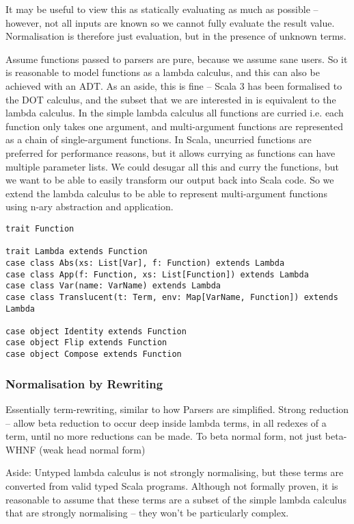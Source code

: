 \documentclass[../../main.tex]{subfiles}
\begin{document}
It may be useful to view this as statically evaluating as much as possible -- however, not all inputs are known so we cannot fully evaluate the result value.
Normalisation is therefore just evaluation, but in the presence of unknown terms.

Assume functions passed to parsers are pure, because we assume sane users.
So it is reasonable to model functions as a lambda calculus, and this can also be achieved with an ADT.
As an aside, this is fine -- Scala 3 has been formalised to the DOT calculus, and the subset that we are interested in is equivalent to the lambda calculus.
In the simple lambda calculus all functions are curried i.e. each function only takes one argument, and multi-argument functions are represented as a chain of single-argument functions.
In Scala, uncurried functions are preferred for performance reasons, but it allows currying as functions can have multiple parameter lists.
We could desugar all this and curry the functions, but we want to be able to easily transform our output back into Scala code.
So we extend the lambda calculus to be able to represent multi-argument functions using n-ary abstraction and application.

\begin{verbatim}
trait Function

trait Lambda extends Function
case class Abs(xs: List[Var], f: Function) extends Lambda
case class App(f: Function, xs: List[Function]) extends Lambda
case class Var(name: VarName) extends Lambda
case class Translucent(t: Term, env: Map[VarName, Function]) extends Lambda

case object Identity extends Function
case object Flip extends Function
case object Compose extends Function
\end{verbatim}

\subsubsection{Normalisation by Rewriting}
Essentially term-rewriting, similar to how Parsers are simplified.
Strong reduction -- allow beta reduction to occur deep inside lambda terms, in all redexes of a term, until no more reductions can be made.
To beta normal form, not just beta-WHNF (weak head normal form) %

Aside: Untyped lambda calculus is not strongly normalising, but these terms are converted from valid typed Scala programs.
Although not formally proven, it is reasonable to assume that these terms are a subset of the simple lambda calculus that are strongly normalising -- they won't be particularly complex.
\end{document}
